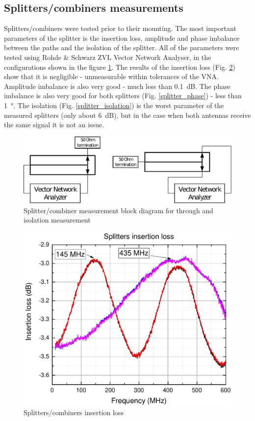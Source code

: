 \subsection{Splitters/combiners measurements}
Splitters/combiners were tested prior to their mounting. The most important parameters of the splitter is the insertion loss, amplitude and phase imbalance between the paths and the isolation of the splitter. All of the parameters were tested using Rohde \& Schwarz ZVL Vector Network Analyser, in the configurations shown in the figure \ref{splitter_measurement_diagram}. The results of the insertion loss (Fig. \ref{splitter_amplitude}) show that it is negligible - unmeasurable within tolerances of the VNA. Amplitude imbalance is also very good - much less than \SI{0.1}{\dB}. The phase imbalance is also very good for both splitters (Fig. \ref{splitter_phase}) - less than \SI{1}{\degree}. The isolation (Fig. \ref{splitter_isolation}) is the worst parameter of the measured splitters (only about \SI{6}{\dB}), but in the case when both antennas receive the same signal it is not an issue.

\begin{figure}
    \centering
    \includegraphics[width=0.75\paperwidth]{img/7/splitter_measurement_diagram.pdf}
    \caption{Splitter/combiner measurement block diagram for through and isolation measurement}
    \label{splitter_measurement_diagram}
\end{figure}

\begin{figure}
    \centering
    \includegraphics[width=0.6\paperwidth]{img/7/splitter_amplitude.pdf}
    \caption{Splitters/combiners insertion loss}
    \label{splitter_amplitude}
\end{figure}


